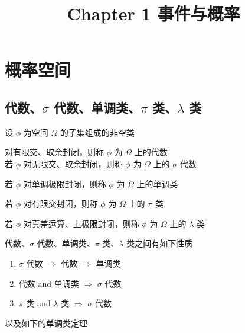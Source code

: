 \documentclass[12pt,a4paper]{amsart}
\title{Chapter 1 事件与概率}
\begin{document}
\maketitle

\section{概率空间}

\subsection{代数、$\sigma$ 代数、单调类、$\pi$ 类、$\lambda$ 类}

设 $\phi$ 为空间 $\Omega$ 的子集组成的非空类

\begin{definition}
    对有限交、取余封闭，则称 $\phi$ 为 $\Omega$ 上的代数 \\
    若 $\phi$ 对无限交、取余封闭，则称 $\phi$ 为 $\Omega$ 上的 $\sigma$ 代数
\end{definition}

\begin{definition}[单调类]
    若 $\phi$ 对单调极限封闭，则称 $\phi$ 为 $\Omega$ 上的单调类
\end{definition}

\begin{definition}[$\pi$ 类]
    若 $\phi$ 对有限交封闭，则称 $\phi$ 为 $\Omega$ 上的 $\pi$ 类
\end{definition}

\begin{definition}[$\lambda$ 类]
    若 $\phi$ 对真差运算、上极限封闭，则称 $\phi$ 为 $\Omega$ 上的 $\lambda$ 类
\end{definition}

代数、$\sigma$ 代数、单调类、$\pi$ 类、$\lambda$ 类之间有如下性质

\begin{proposition}
    \begin{enumerate}
        \item $\sigma$ 代数 $\Rightarrow$ 代数 $\Rightarrow$ 单调类
        \item 代数 and 单调类 $\Rightarrow$ $\sigma$ 代数
        \item $\pi$ 类 and $\lambda$ 类 $\Rightarrow$ $\sigma$ 代数
    \end{enumerate}
\end{proposition}

以及如下的单调类定理
\end{document}
